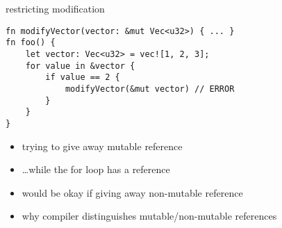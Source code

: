 
\begin{frame}[fragile,label=restrictMod]{restricting modification}
    \begin{verbatim}
fn modifyVector(vector: &mut Vec<u32>) { ... }
fn foo() {
    let vector: Vec<u32> = vec![1, 2, 3];
    for value in &vector {
        if value == 2 {
            modifyVector(&mut vector) // ERROR
        }
    }
}
    \end{verbatim}
\begin{itemize}
    \item trying to give away mutable reference
    \item \ldots while the for loop has a reference
    \vspace{.5cm}
    \item would be okay if giving away non-mutable reference
    \item why compiler distinguishes mutable/non-mutable references
\end{itemize}
\end{frame}


